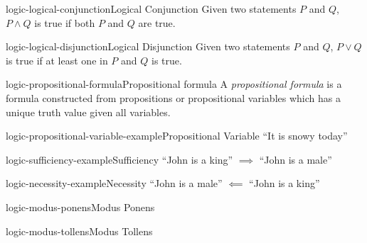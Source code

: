 \documentclass[preview]{standalone}
\begin{document}
\begin{snippetdefinition}{logic-logical-conjunction}{Logical Conjunction}
    Given two statements \(P\) and \(Q\), \(P \land Q\) is true if both \(P\) and \(Q\) are true.
\end{snippetdefinition}

\begin{snippetdefinition}{logic-logical-disjunction}{Logical Disjunction}
    Given two statements \(P\) and \(Q\), \(P \lor Q\) is true if at least one in \(P\) and \(Q\) is true.
\end{snippetdefinition}

\begin{snippetdefinition}{logic-propositional-formula}{Propositional formula}
    A \textit{propositional formula} is a formula constructed from propositions or
    propositional variables which has a unique truth value given all variables.
\end{snippetdefinition}

\begin{snippetexample}{logic-propositional-variable-example}{Propositional Variable}
    ``It is snowy today''
\end{snippetexample}

\begin{snippetexample}{logic-sufficiency-example}{Sufficiency}
    ``John is a king'' \(\implies\) ``John is a male''
\end{snippetexample}

\begin{snippetexample}{logic-necessity-example}{Necessity}
    ``John is a male'' \(\impliedby\) ``John is a king''
\end{snippetexample}

\begin{snippetdefinition}{logic-modus-ponens}{Modus Ponens}
    \begin{prooftree}
    \end{prooftree}
\end{snippetdefinition}

\begin{snippetdefinition}{logic-modus-tollens}{Modus Tollens}
    \begin{prooftree}
    \end{prooftree}
\end{snippetdefinition}
\end{document}
